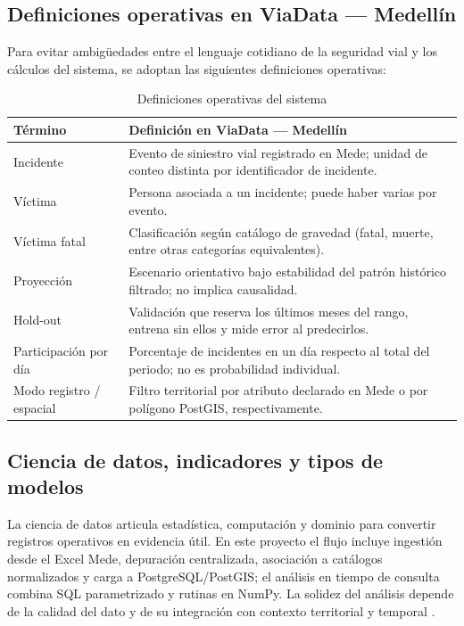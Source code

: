 \subsection{Definiciones operativas en ViaData — Medellín}
Para evitar ambigüedades entre el lenguaje cotidiano de la seguridad vial y los cálculos del sistema, se adoptan las siguientes definiciones operativas:

\begin{table}[H]
	\centering
	\caption{Definiciones operativas del sistema}
	\label{tab:definiciones-operativas}
	\small
	\begin{tabularx}{\linewidth}{@{}l X@{}}
		\toprule
		Término & Definición en ViaData — Medellín \\
		\midrule
		Incidente & Evento de siniestro vial registrado en Mede; unidad de conteo distinta por identificador de incidente. \\
		Víctima & Persona asociada a un incidente; puede haber varias por evento. \\
		Víctima fatal & Clasificación según catálogo de gravedad (fatal, muerte, entre otras categorías equivalentes). \\
		Proyección & Escenario orientativo bajo estabilidad del patrón histórico filtrado; no implica causalidad. \\
		Hold-out & Validación que reserva los últimos meses del rango, entrena sin ellos y mide error al predecirlos. \\
		Participación por día & Porcentaje de incidentes en un día respecto al total del periodo; no es probabilidad individual. \\
		Modo registro / espacial & Filtro territorial por atributo declarado en Mede o por polígono PostGIS, respectivamente. \\
		\bottomrule
	\end{tabularx}
\end{table}

\clearpage

\subsection{Ciencia de datos, indicadores y tipos de modelos}
La ciencia de datos articula estadística, computación y dominio para convertir registros operativos en evidencia útil. En este proyecto el flujo incluye ingestión desde el Excel Mede, depuración centralizada, asociación a catálogos normalizados y carga a PostgreSQL/PostGIS; el análisis en tiempo de consulta combina SQL parametrizado y rutinas en NumPy. La solidez del análisis depende de la calidad del dato y de su integración con contexto territorial y temporal \cite{provost2022,atancuri2024}.

